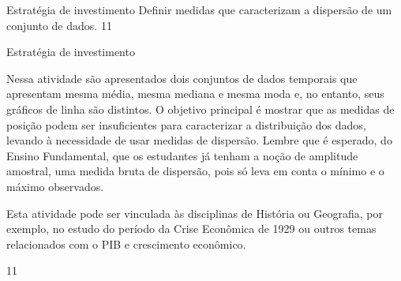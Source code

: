 \cleardoublepage
\def\currentcolor{session1}
\begin{objectives}{Estratégia de investimento}
{
Definir medidas que caracterizam a dispersão de um conjunto de dados.
}{1}{1}
\end{objectives}
\begin{sugestions}{Estratégia de investimento}
{
Nessa atividade são apresentados dois conjuntos de dados temporais que apresentam mesma média, mesma mediana e mesma moda e, no entanto, seus gráficos de linha são distintos. O objetivo principal é mostrar que as medidas de posição podem ser insuficientes para caracterizar a distribuição dos dados, levando à necessidade de usar medidas de dispersão. Lembre que é esperado, do Ensino Fundamental, que os estudantes já tenham a noção de amplitude amostral, uma medida bruta de dispersão, pois só leva em conta o mínimo e o máximo observados.

Esta atividade pode ser vinculada às disciplinas de História ou Geografia, por exemplo, no estudo do período da Crise Econômica de 1929 ou outros temas relacionados com o PIB e crescimento econômico.
}{1}{1}
\end{sugestions}
\clearmargin
